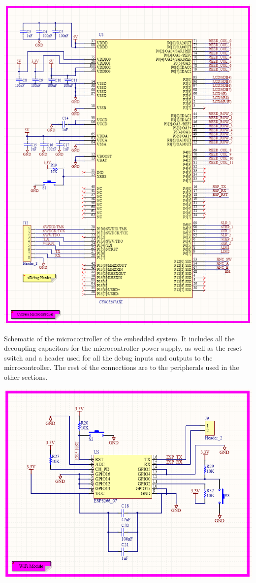 \documentclass[12pt]{article}
\begin{document}
\centerline{\includegraphics[scale=.75]{SchMicro}}

\begin{center}
Schematic of the microcontroller of the embedded system. It includes all the decoupling capacitors for the microcontroller power supply, as well as the reset switch and a header used for all the debug inputs and outputs to the microcontroller. The rest of the connections are to the peripherals used in the other sections.
\end{center}

\vspace*{5mm}

\vspace*{5mm}

\centerline{\includegraphics[scale=.75]{SchWiFi}}
\end{document}
